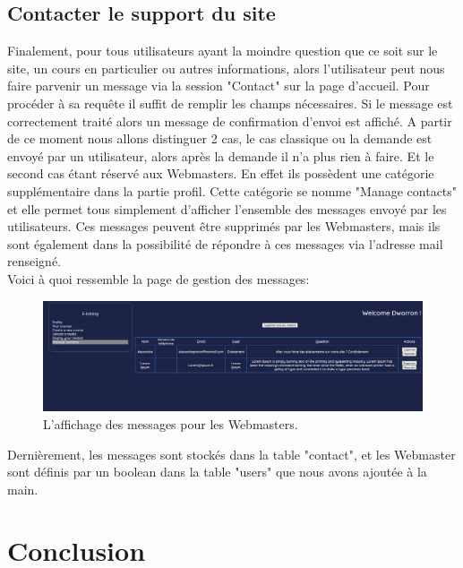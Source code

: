 \documentclass[a4paper,10pt]{article}
\begin{document}
\subsection{Contacter le support du site}
Finalement, pour tous utilisateurs ayant la moindre question que ce soit sur le site, un cours en particulier ou autres informations, alors l'utilisateur peut nous faire parvenir un message via la session "Contact" sur la page d'accueil. Pour procéder à sa requête il suffit de remplir les champs nécessaires. Si le message est correctement traité alors un message de confirmation d'envoi est affiché. A partir de ce moment nous allons distinguer 2 cas, le cas classique ou la demande est envoyé par un utilisateur, alors après la demande il n'a plus rien à faire. Et le second cas étant réservé aux Webmasters. En effet ils possèdent une catégorie supplémentaire dans la partie profil. Cette catégorie se nomme "Manage contacts" et elle permet tous simplement d'afficher l'ensemble des messages envoyé par les utilisateurs. Ces messages peuvent être supprimés par les Webmasters, mais ils sont également dans la possibilité de répondre à ces messages via l'adresse mail renseigné.\\

Voici à quoi ressemble la page de gestion des messages:
\begin{figure}[!h]
\centerline{\includegraphics[width=16cm]{images/manageContact.PNG}}
\caption{L'affichage des messages pour les Webmasters.}
\label{fig}
\end{figure}

Dernièrement, les messages sont stockés dans la table "contact", et les Webmaster sont définis par un boolean dans la table "users" que nous avons ajoutée à la main.

\section{Conclusion}
\end{document}
